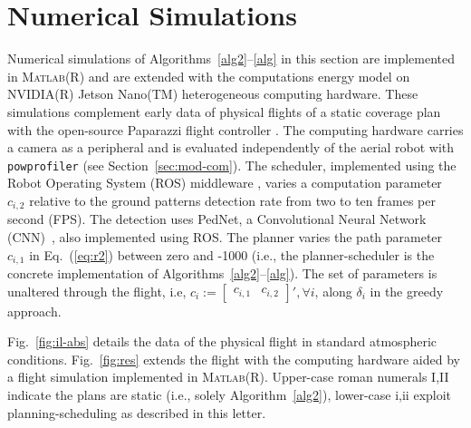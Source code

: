 \documentclass[letterpaper,10pt,journal,twoside]{IEEEtran}
\newcommand{\stt}[1]{{\small\tt #1}} %
\newcommand{\powprof}{\stt{powprofiler}}
\newcommand{\figpath}{./figures}
\theoremstyle{definition}
\begin{document}
\begin{figure*}
  \centering
  \footnotesize
  
  \label{fig:2}
  \caption{.}
  \vspace*{-3ex}
\end{figure*}


\vspace*{-1.5ex}
\section{Numerical Simulations} %
\label{sec:experimental}        %
\vspace*{-.2ex}

Numerical simulations of Algorithms~\ref{alg2}--\ref{alg} in this section are implemented in \textsc{Matlab}\hspace{.5ex}(R) and are extended with the computations energy model on NVIDIA\hspace{.5ex}(R) Jetson Nano\hspace{.5ex}(TM) heterogeneous computing hardware. These simulations complement early data of physical flights of a static coverage plan with the open-source Paparazzi flight controller%
.
The computing hardware carries a camera as a peripheral and is evaluated independently of the aerial robot with \powprof{} (see Section~\ref{sec:mod-com}). The scheduler, implemented using the Robot Operating System (ROS) middleware%
, varies a computation parameter $c_{i,2}$ relative to the ground patterns detection rate from two to ten frames per second (FPS). The detection uses PedNet, a Convolutional Neural Network (CNN)~\cite{ullah2018pednet}, also implemented using ROS. The planner varies the path parameter $c_{i,1}$ in Eq.~(\ref{eq:r2}) between zero and -1000 (i.e., the planner-scheduler is the concrete implementation of Algorithms~\ref{alg2}--\ref{alg}). The set of parameters is unaltered through the flight, i.e, $c_i:=\begin{bmatrix}c_{i,1}&c_{i,2}\end{bmatrix}',\forall i${\color{blue}, along $\delta_i$ %
in the greedy approach}. 

Fig.~\ref{fig:il-abs} details the data of the physical flight  
in standard atmospheric conditions. 
Fig.~\ref{fig:res} extends the flight with the computing hardware aided by a flight simulation implemented in \textsc{Matlab}\hspace{.5ex}(R). 
Upper-case roman numerals I,II indicate the plans are static (i.e., solely Algorithm~\ref{alg2}), lower-case i,ii exploit planning-scheduling as described in this letter.
\end{document}
